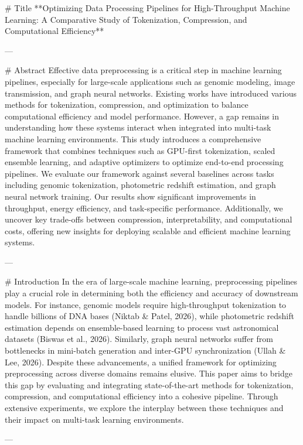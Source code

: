 # Title  
**Optimizing Data Processing Pipelines for High-Throughput Machine Learning: A Comparative Study of Tokenization, Compression, and Computational Efficiency**

---

# Abstract  
Effective data preprocessing is a critical step in machine learning pipelines, especially for large-scale applications such as genomic modeling, image transmission, and graph neural networks. Existing works have introduced various methods for tokenization, compression, and optimization to balance computational efficiency and model performance. However, a gap remains in understanding how these systems interact when integrated into multi-task machine learning environments. This study introduces a comprehensive framework that combines techniques such as GPU-first tokenization, scaled ensemble learning, and adaptive optimizers to optimize end-to-end processing pipelines. We evaluate our framework against several baselines across tasks including genomic tokenization, photometric redshift estimation, and graph neural network training. Our results show significant improvements in throughput, energy efficiency, and task-specific performance. Additionally, we uncover key trade-offs between compression, interpretability, and computational costs, offering new insights for deploying scalable and efficient machine learning systems.

---

# Introduction  
In the era of large-scale machine learning, preprocessing pipelines play a crucial role in determining both the efficiency and accuracy of downstream models. For instance, genomic models require high-throughput tokenization to handle billions of DNA bases (Niktab & Patel, 2026), while photometric redshift estimation depends on ensemble-based learning to process vast astronomical datasets (Biswas et al., 2026). Similarly, graph neural networks suffer from bottlenecks in mini-batch generation and inter-GPU synchronization (Ullah & Lee, 2026). Despite these advancements, a unified framework for optimizing preprocessing across diverse domains remains elusive. This paper aims to bridge this gap by evaluating and integrating state-of-the-art methods for tokenization, compression, and computational efficiency into a cohesive pipeline. Through extensive experiments, we explore the interplay between these techniques and their impact on multi-task learning environments.

---

